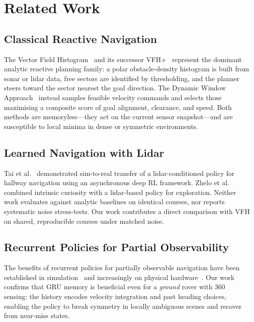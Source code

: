 \documentclass[letterpaper, 10pt, journal]{IEEEtran}
\begin{document}
\section{Related Work}

\subsection{Classical Reactive Navigation}

The Vector Field Histogram~\cite{vfh} and its successor VFH+~\cite{vfhplus}
represent the dominant analytic reactive planning family: a polar obstacle-density
histogram is built from sonar or lidar data, free sectors are identified by
thresholding, and the planner steers toward the sector nearest the goal direction.
The Dynamic Window Approach~\cite{dwa} instead samples feasible velocity commands
and selects those maximising a composite score of goal alignment, clearance, and
speed. Both methods are memoryless---they act on the current sensor snapshot---and
are susceptible to local minima in dense or symmetric environments.

\subsection{Learned Navigation with Lidar}

Tai et al.~\cite{tai2017virtual} demonstrated sim-to-real transfer of a
lidar-conditioned policy for hallway navigation using an asynchronous deep RL
framework. Zhelo et al.~\cite{zhelo2018curiosity} combined intrinsic curiosity with
a lidar-based policy for exploration. Neither work evaluates against analytic baselines
on identical courses, nor reports systematic noise stress-tests. Our work contributes
a direct comparison with VFH on shared, reproducible courses under matched noise.

\subsection{Recurrent Policies for Partial Observability}

The benefits of recurrent policies for partially observable navigation have been
established in simulation~\cite{mirowski2016learning, zhu2017target} and increasingly
on physical hardware~\cite{kahn2021badgr}. Our work confirms that GRU memory is
beneficial even for a \emph{ground} rover with 360\textdegree{} sensing: the history
encodes velocity integration and past heading choices, enabling the policy to break
symmetry in locally ambiguous scenes and recover from near-miss states.
\end{document}
